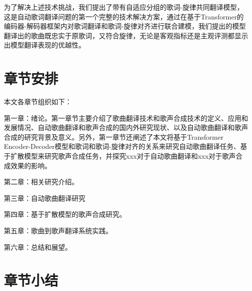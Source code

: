 为了解决上述技术挑战，我们提出了带有自适应分组的歌词-旋律共同翻译模型，这是自动歌词翻译问题的第一个完整的技术解决方案，通过在基于Transformer的编码器-解码器框架内对歌词翻译和歌词-旋律对齐进行联合建模，我们提出的模型翻译出的歌曲既忠实于原歌词，又符合旋律，无论是客观指标还是主观评测都显示出模型翻译表现的优越性。
\section{章节安排}
本文各章节组织如下：


第一章：绪论。第一章节主要介绍了歌曲翻译技术和歌声合成技术的定义、应用和发展情况、自动歌曲翻译和歌声合成的国内外研究现状、以及自动歌曲翻译和歌声合成的研究背景及意义。另外，第一章节还阐述了本文将基于Transformer Encoder-Decoder模型和歌词和歌词-旋律对齐的关系来研究自动歌曲翻译任务、基于扩散模型来研究歌声合成任务，并探究xxx对于自动歌曲翻译和xxx对于歌声合成效果的影响。

第二章：相关研究介绍。

第三章：自动歌曲翻译研究

第四章：基于扩散模型的歌声合成研究。

第五章：歌曲到歌声翻译系统实践。

第六章：总结和展望。
\section{章节小结}
